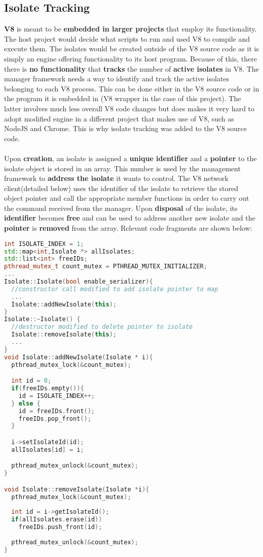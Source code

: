 \documentclass{l4proj}
\begin{document}
\subsection{Isolate Tracking}
\hspace*{3em} \textbf{V8} is meant to be \textbf{embedded in larger projects} that employ its functionality. The host project would decide what scripts to run and used V8 to compile and execute them. The isolates would be created outside of the V8 source code as it is simply an engine offering functionality to its host program. Because of this, there there is \textbf{no functionality} that \textbf{tracks} the number of \textbf{active isolates} in V8. The manager framework needs a way to identify and track the active isolates belonging to each V8 process. This can be done either in the V8 source code or in the program it is embedded in (V8 wrapper in the case of this project). The latter involves much less overall V8 code changes but does makes it very hard to adopt modified engine in a different project that makes use of V8, such as NodeJS and Chrome. This is why isolate tracking was added to the V8 source code.
\\\\
\hspace*{3em} Upon \textbf{creation}, an isolate is assigned a \textbf{unique identifier} and a \textbf{pointer} to the isolate object is stored in an array. This number is used by the management framework to \textbf{address the isolate} it wants to control. The V8 network client(detailed below) uses the identifier of the isolate to retrieve the stored object pointer and call the appropriate member functions in order to carry out the command received from the manager. Upon \textbf{disposal} of the isolate, its \textbf{identifier} becomes \textbf{free} and can be used to address another new isolate and the \textbf{pointer} is \textbf{removed} from the array. Relevant code fragments are shown below:
\begin{lstlisting}[language=cpp]
int ISOLATE_INDEX = 1;
std::map<int,Isolate *> allIsolates;
std::list<int> freeIDs;
pthread_mutex_t count_mutex = PTHREAD_MUTEX_INITIALIZER;
...
Isolate::Isolate(bool enable_serializer){ 
  //constructor call modified to add isolate pointer to map
  ...
  Isolate::addNewIsolate(this);
}
Isolate::~Isolate() {
  //destructor modified to delete pointer to isolate
  Isolate::removeIsolate(this);
  ...
}
void Isolate::addNewIsolate(Isolate * i){
  pthread_mutex_lock(&count_mutex);

  int id = 0;  
  if(freeIDs.empty()){
    id = ISOLATE_INDEX++;
  } else {
    id = freeIDs.front();
    freeIDs.pop_front();
  }

  i->setIsolateId(id);
  allIsolates[id] = i;

  pthread_mutex_unlock(&count_mutex);
}

void Isolate::removeIsolate(Isolate *i){
  pthread_mutex_lock(&count_mutex);
  
  int id = i->getIsolateId();
  if(allIsolates.erase(id))
    freeIDs.push_front(id);
  
  pthread_mutex_unlock(&count_mutex);
}
\end{lstlisting}
\end{document}
